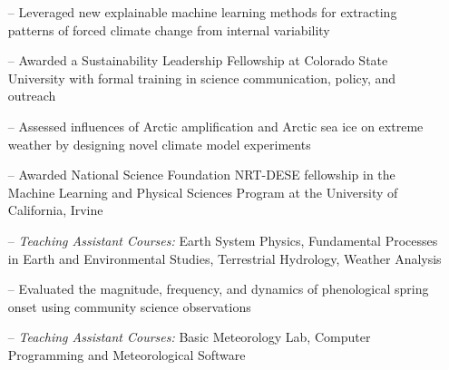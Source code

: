 \documentclass[10pt,a4paper]{altacv}
\begin{document}
\begin{itemize}
    \setlength{\itemindent}{0.5em}
    \item[--]   \small{Leveraged new explainable machine learning methods for extracting patterns of forced climate change from internal variability}
    \item[--]    \small{Awarded a Sustainability Leadership Fellowship at Colorado State University with formal training in science communication, policy, and outreach}
\end{itemize}
\medskip

\begin{itemize}
    \setlength{\itemindent}{0.5em}
    \item[--]   \small{Assessed influences of Arctic amplification and Arctic sea ice on extreme weather by designing novel climate model experiments}
    \item[--]    \small{Awarded National Science Foundation NRT-DESE fellowship in the Machine Learning and Physical Sciences Program at the University of California, Irvine}
    \item[--]   \small{\textit{Teaching Assistant Courses:} Earth System Physics, Fundamental Processes in Earth and Environmental Studies, Terrestrial Hydrology, Weather Analysis}
\end{itemize}
\medskip

\begin{itemize}
    \setlength{\itemindent}{0.5em}
    \item[--]   \small{Evaluated the magnitude, frequency, and dynamics of phenological spring onset using community science observations}
    \item[--]   \small{\textit{Teaching Assistant Courses:} Basic Meteorology Lab, Computer Programming and Meteorological Software}
\end{itemize}
\medskip


\hspace*{-1.1cm} 


\end{document}
